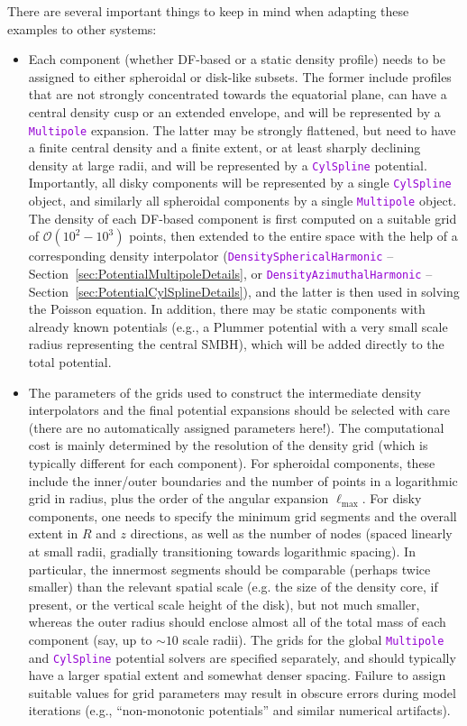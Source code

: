 \documentclass[12pt]{article}
\newcommand{\ttt}[1]{\textcolor{darkviolet}{\texttt{#1}}}
\begin{document}
There are several important things to keep in mind when adapting these examples to other systems:
\begin{itemize}\item Each component (whether DF-based or a static density profile) needs to be assigned to either spheroidal or disk-like subsets. The former include profiles that are not strongly concentrated towards the equatorial plane, can have a central density cusp or an extended envelope, and will be represented by a \ttt{Multipole} expansion. The latter may be strongly flattened, but need to have a finite central density and a finite extent, or at least sharply declining density at large radii, and will be represented by a \ttt{CylSpline} potential. Importantly, all disky components will be represented by a single \ttt{CylSpline} object, and similarly all spheroidal components by a single \ttt{Multipole} object. The density of each DF-based component is first computed on a suitable grid of $\mathcal{O}(10^2-10^3)$ points, then extended to the entire space with the help of a corresponding density interpolator (\ttt{DensitySphericalHarmonic} -- Section~\ref{sec:PotentialMultipoleDetails}, or \ttt{DensityAzimuthalHarmonic} -- Section~\ref{sec:PotentialCylSplineDetails}), and the latter is then used in solving the Poisson equation. In addition, there may be static components with already known potentials (e.g., a Plummer potential with a very small scale radius representing the central SMBH), which will be added directly to the total potential.
\item The parameters of the grids used to construct the intermediate density interpolators and the final potential expansions should be selected with care (there are no automatically assigned parameters here!). The computational cost is mainly determined by the resolution of the density grid (which is typically different for each component). For spheroidal components, these include the inner/outer boundaries and the number of points in a logarithmic grid in radius, plus the order of the angular expansion $\ell_\mathrm{max}$. For disky components, one needs to specify the minimum grid segments and the overall extent in $R$ and $z$ directions, as well as the number of nodes (spaced linearly at small radii, gradially transitioning towards logarithmic spacing). In particular, the innermost segments should be comparable (perhaps twice smaller) than the relevant spatial scale (e.g. the size of the density core, if present, or the vertical scale height of the disk), but not much smaller, whereas the outer radius should enclose almost all of the total mass of each component (say, up to $\sim 10$ scale radii). The grids for the global \ttt{Multipole} and \ttt{CylSpline} potential solvers are specified separately, and should typically have a larger spatial extent and somewhat denser spacing. Failure to assign suitable values for grid parameters may result in obscure errors during model iterations (e.g., ``non-monotonic potentials'' and similar numerical artifacts).

\end{itemize}
\end{document}

